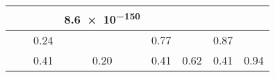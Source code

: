 \begin{table}[p]
{\begin{tabularx}{1.1\textwidth}{ll *{6}{C}}
        \Replicate{} & \ReplicateModel{} & \NAMark{} & \SigPValue{} \num{8.6e-150} &  &  &  &  \\
        \midrule
        \Anthropic{} & \AnthropicModel{} & \NotSigPValue{} \num{0.24} & \NAMark{} & \NotSigPValue{} \num{0.77} & \NAMark{} & \NotSigPValue{} \num{0.87} & \NAMark{} \\
        \OpenAI{} & \OpenAIChatModel{} & \NotSigPValue{} \num{0.41} & \NotSigPValue{} \num{0.20} & \NotSigPValue{} \num{0.41} & \NotSigPValue{} \num{0.62} & \NotSigPValue{} \num{0.41} & \NotSigPValue{} \num{0.94} \\   
        \bottomrule
    \end{tabularx}
    }
\end{table}
